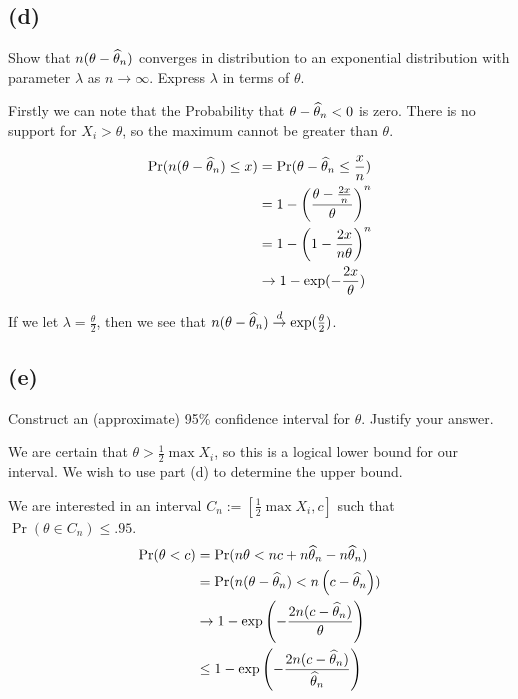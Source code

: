 \documentclass[12pt]{paper}
\begin{document}
\subsection{(d)}

Show that $n( \theta - \widehat{ \theta }_{n})$ converges in distribution to an exponential
distribution with parameter $\lambda$ as $n\rightarrow\infty$. Express $\lambda$ in terms of $\theta$.

Firstly we can note that the Probability that $\theta - \widehat{ \theta }_{n} < 0$ is
zero. There is no support for $X_i > \theta$, so the maximum cannot be
greater than $\theta$.  

\begin{align*}
  \Pr( n ( \theta - \widehat{ \theta }_{n}) \leq x) &= \Pr( \theta - \widehat{ \theta }_{n} \leq \frac{x}{n})\\
                             &= 1 - \left( \frac{\theta - \frac{2x}{n}}{\theta}
                               \right)^n\\
                             &= 1 - \left(  1 - \frac{2x}{n\theta} \right)^n\\
  &\rightarrow 1 - \exp( - \frac{2x}{\theta})
\end{align*}

If we let $\lambda = \frac{\theta}{2}$, then we see that $n( \theta - \widehat{ \theta }_{n})
\overset{d}{\to} \exp( \frac{\theta}{2})$.

\subsection{(e)}

Construct an (approximate) 95\% confidence interval for $\theta$. Justify
your answer.

We are certain that $\theta > \frac{1}{2}\max{X_i}$, so this is a logical
lower bound for our interval. We wish to use part (d) to determine the
upper bound.

We are interested in an interval $C_n := [\frac{1}{2} \max{X_i}, c]$ such
that $\Pr( \theta \in C_n ) \leq .95$.
\begin{align*}
  \Pr( \theta < c ) &= \Pr( n\theta < nc + n \widehat{ \theta }_{n} - n \widehat{ \theta }_{n})\\
               &= \Pr( n( \theta - \widehat{ \theta }_{n}) < n \left( c - \widehat{ \theta }_{n}\right)
                 )\\
               &\rightarrow 1 - \exp \left( - \frac{2n ( c - \widehat{ \theta }_{n})}{\theta} \right)\\
  &\leq 1 - \exp \left( - \frac{2n ( c - \widehat{ \theta }_{n})}{\widehat{ \theta }_{n}} \right)
\end{align*}
\end{document}
